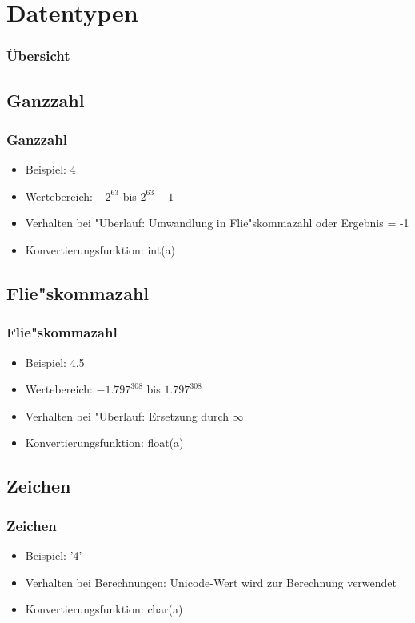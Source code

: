 \documentclass{beamer}
\begin{document}
\section{Datentypen}
  \begin{frame}[shrink]
    \frametitle{Übersicht}
    \tableofcontents[currentsection]
  \end{frame}
\subsection{Ganzzahl}
\begin{frame}\frametitle{Ganzzahl}
 \begin{itemize}
 \item Beispiel: 4
\item Wertebereich: $-2^{63}$ bis $2^{63}-1$
\item Verhalten bei "Uberlauf: Umwandlung in Flie"skommazahl oder Ergebnis = -1
\item Konvertierungsfunktion: int(a)
 \end{itemize}
\end{frame}
\subsection{Flie"skommazahl}
\begin{frame}
\frametitle{Flie"skommazahl}
 \begin{itemize}
 \item Beispiel: 4.5
\item Wertebereich: $-1.797^{308}$ bis $1.797^{308}$
\item Verhalten bei "Uberlauf: Ersetzung durch \(\infty\)
\item Konvertierungsfunktion: float(a)
 \end{itemize}
\end{frame}
\subsection{Zeichen}
\begin{frame}
\frametitle{Zeichen}
 \begin{itemize}
 \item Beispiel: '4'
\item Verhalten bei Berechnungen: Unicode-Wert wird zur Berechnung verwendet
\item Konvertierungsfunktion: char(a)
 \end{itemize}
\end{frame}
\end{document}
